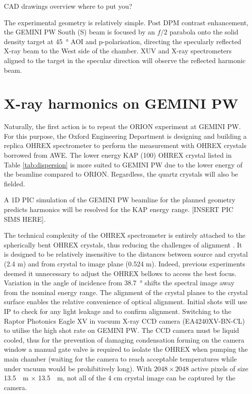 CAD drawings overview where to put you?

The experimental geometry is relatively simple. Post \ac{DPM} contrast enhancement, the GEMINI PW South (S) beam is focused by an $f/2$ parabola onto the solid density target at \qty{45}{\degree} \ac{AOI} and p-polarisation, directing the specularly reflected X-ray beam to the West side of the chamber. XUV and X-ray spectrometers aligned to the target in the specular direction will observe the reflected harmonic beam.

\section{X-ray harmonics on GEMINI PW}
Naturally, the first action is to repeat the ORION experiment at GEMINI PW. For this purpose, the Oxford Engineering Department is designing and building a replica OHREX spectrometer to perform the measurement with OHREX crystals borrowed from AWE. The lower energy KAP (100) OHREX crystal listed in Table \ref{tab:dispersion} is more suited to GEMINI PW due to the lower energy of the beamline compared to ORION. Regardless, the quartz crystals will also be fielded. 

A 1D PIC simulation of the GEMINI PW beamline for the planned geometry predicts harmonics will be resolved for the KAP energy range.
[INSERT PIC SIMS HERE].


The technical complexity of the OHREX spectrometer is entirely attached to the spherically bent OHREX crystals, thus reducing the challenges of alignment \cite{beiersdorferLineshapeSpectroscopyVery2016}. It is designed to be relatively insensitive to the distances between source and crystal (2.4 m) and from crystal to image plane (0.524 m). Indeed, previous experiments deemed it unnecessary to adjust the OHREX bellows to access the best focus. Variation in the angle of incidence from \qty{38.7}{\degree} shifts the spectral image away from the nominal energy range. 
The alignment of the crystal planes to the crystal surface enables the relative convenience of optical alignment. Initial shots will use IP to check for any light leakage and to confirm alignment. Switching to the Raptor Photonics Eagle XV in vacuum X-ray CCD camera (EA4240XV-BN-CL) \cite{EagleXVVacuum} to utilise the high shot rate on GEMINI PW. The CCD camera must be liquid cooled, thus for the prevention of damaging condensation forming on the camera window a manual gate valve is required to isolate the OHREX when pumping the main chamber (waiting for the camera to reach acceptable temperatures while under vacuum would be prohibitively long). With $2048 \times 2048$ active pixels of size \qty{13.5}{\mu m} $\times$ \qty{13.5}{\mu m}, not all of the 4 cm crystal image can be captured by the camera.


